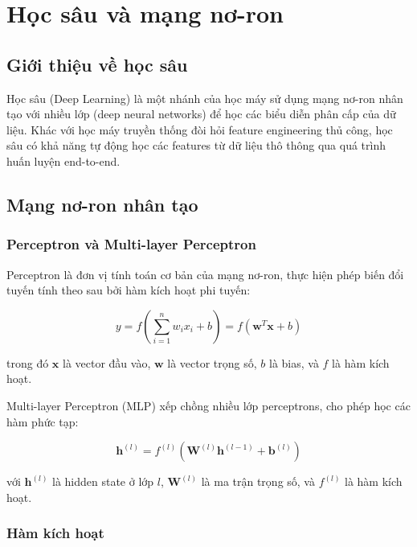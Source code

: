 \section{Học sâu và mạng nơ-ron}
\label{sec:deep_learning}

\subsection{Giới thiệu về học sâu}

Học sâu (Deep Learning) là một nhánh của học máy sử dụng mạng nơ-ron nhân tạo với nhiều lớp (deep neural networks) để học các biểu diễn phân cấp của dữ liệu. Khác với học máy truyền thống đòi hỏi feature engineering thủ công, học sâu có khả năng tự động học các features từ dữ liệu thô thông qua quá trình huấn luyện end-to-end.

\subsection{Mạng nơ-ron nhân tạo}

\subsubsection{Perceptron và Multi-layer Perceptron}

Perceptron là đơn vị tính toán cơ bản của mạng nơ-ron, thực hiện phép biến đổi tuyến tính theo sau bởi hàm kích hoạt phi tuyến:

\begin{equation}
y = f\left(\sum_{i=1}^{n} w_i x_i + b\right) = f(\mathbf{w}^T \mathbf{x} + b)
\end{equation}

trong đó $\mathbf{x}$ là vector đầu vào, $\mathbf{w}$ là vector trọng số, $b$ là bias, và $f$ là hàm kích hoạt.

Multi-layer Perceptron (MLP) xếp chồng nhiều lớp perceptrons, cho phép học các hàm phức tạp:

\begin{equation}
\mathbf{h}^{(l)} = f^{(l)}\left(\mathbf{W}^{(l)} \mathbf{h}^{(l-1)} + \mathbf{b}^{(l)}\right)
\end{equation}

với $\mathbf{h}^{(l)}$ là hidden state ở lớp $l$, $\mathbf{W}^{(l)}$ là ma trận trọng số, và $f^{(l)}$ là hàm kích hoạt.

\subsubsection{Hàm kích hoạt}


